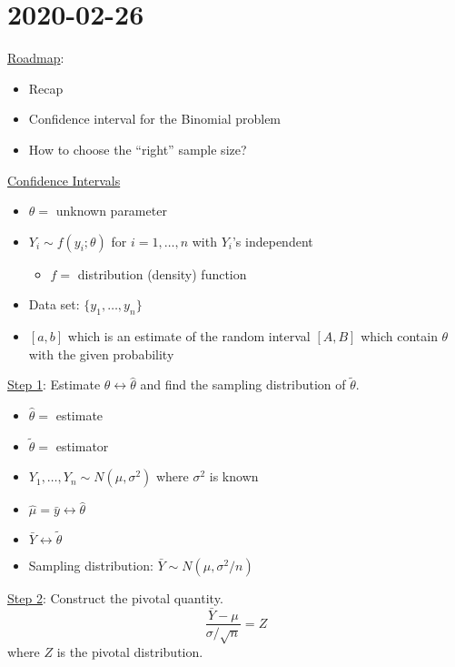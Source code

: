 \section{2020-02-26}
\underline{Roadmap}:
\begin{itemize}
    \item Recap
    \item Confidence interval for the Binomial problem
    \item How to choose the ``right'' sample size?
\end{itemize}
\underline{Confidence Intervals}
\begin{itemize}
    \item $ \theta= $ unknown parameter
    \item $ Y_i \sim f(y_i;\theta) $ for $ i=1,\ldots ,n $ with $ Y_i $'s independent
          \begin{itemize}
              \item $ f= $ distribution (density) function
          \end{itemize}
    \item Data set: $ \{y_1,\ldots ,y_n\} $
    \item $ [a,b] $ which is an estimate of the random interval $ [A,B] $
          which contain $ \theta $ with the given probability
\end{itemize}

\underline{Step 1}: Estimate $ \theta \longleftrightarrow \hat{\theta} $ and
find the sampling distribution of $ \tilde{\theta} $.
\begin{itemize}
    \item $ \hat{\theta}= $ estimate
    \item $ \tilde{\theta}= $ estimator
    \item $ Y_1,\ldots ,Y_n \sim N(\mu,\sigma^2) $ where $ \sigma^2 $ is known
    \item $ \hat{\mu}=\bar{y} \longleftrightarrow \hat{\theta} $
    \item $ \bar{Y} \longleftrightarrow \tilde{\theta} $
    \item Sampling distribution: $ \bar{Y}\sim N(\mu,\sigma^2/n) $
\end{itemize}
\underline{Step 2}: Construct the pivotal quantity.
\[ \frac{\bar{Y}-\mu}{\sigma/\sqrt{n}}=Z \]
where $ Z $ is the pivotal distribution.

